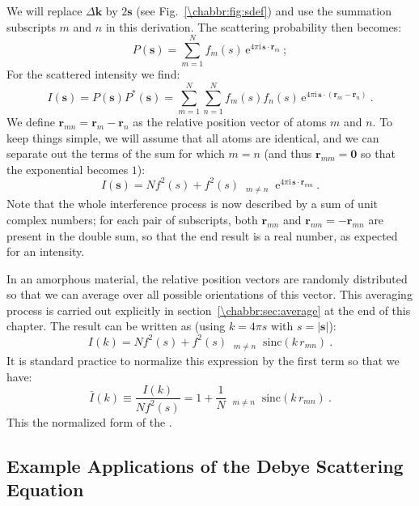 We will replace $\Delta\mathbf{k}$ by $2\mathbf{s}$ (see Fig.~\ref{\chabbr:fig:sdef}) and use the summation subscripts $m$ and $n$ in this derivation.  The scattering probability then becomes:
\[
	P(\mathbf{s}) = \sum_{m=1}^N  f_m(s)\,\mathrm{e}^{4\pi\mathrm{i}\,\mathbf{s}\cdot\mathbf{r}_m}\ ;
\]
For the scattered intensity we find:
\[
	I(\mathbf{s}) = P(\mathbf{s})P^{\ast}(\mathbf{s}) = 
	\sum_{m=1}^N \sum_{n=1}^N  f_m(s)f_n(s)\,\mathrm{e}^{4\pi\mathrm{i}\,\mathbf{s}\cdot(\mathbf{r}_m-\mathbf{r}_n)}\ .
\]
We define $\mathbf{r}_{mn}=\mathbf{r}_m-\mathbf{r}_n$ as the relative position vector of atoms $m$ and $n$.  To keep things simple, we will assume that all atoms are identical, and we can separate out the terms of the sum for which $m=n$ (and thus $\mathbf{r}_{mm}=\mathbf{0}$ so that the exponential becomes $1$):
\begin{equation}
		I(\mathbf{s}) = Nf^2(s) + f^2(s)\mathop{\sum_m^N\sum_n^N}_{\substack{m\ne n}} \mathrm{e}^{4\pi\mathrm{i}\,\mathbf{s}\cdot\mathbf{r}_{mn}}\ .\label{\chabbr:eq:DSE1}
\end{equation}
Note that the whole interference process is now described by a sum of unit complex numbers; for each pair of subscripts, both $\mathbf{r}_{mn}$ and $\mathbf{r}_{nm}=-\mathbf{r}_{mn}$ are present in the double sum, so that the end result is a real number, as expected for an intensity.

In an amorphous material, the relative position vectors are randomly distributed so that we can average over all possible orientations of this vector.  This averaging process is carried out explicitly in section~\ref{\chabbr:sec:average} at the end of this chapter.  The result can be written as (using $k=4\pi s$ with $s=\vert\mathbf{s}\vert$):
\begin{equation}
		I(k) = Nf^2(s) + f^2(s)\mathop{\sum_m^N\sum_n^N}_{\substack{m\ne n}} \text{sinc}(k\,r_{mn})\ .\label{\chabbr:eq:DSE2}
\end{equation}
It is standard practice to normalize this expression by the first term so that we have:
\begin{equation}
		\bar{I}(k)\equiv\frac{I(k)}{Nf^2(s)} = 1  + \frac{1}{N}\mathop{\sum_m^N\sum_n^N}_{\substack{m\ne n}} \text{sinc}(k\,r_{mn})\ .\label{\chabbr:eq:DSE3}
\end{equation}
This the normalized form of the .  


\subsection{Example Applications of the Debye Scattering Equation}\label{\chabbr:ssec:DSEexample}

